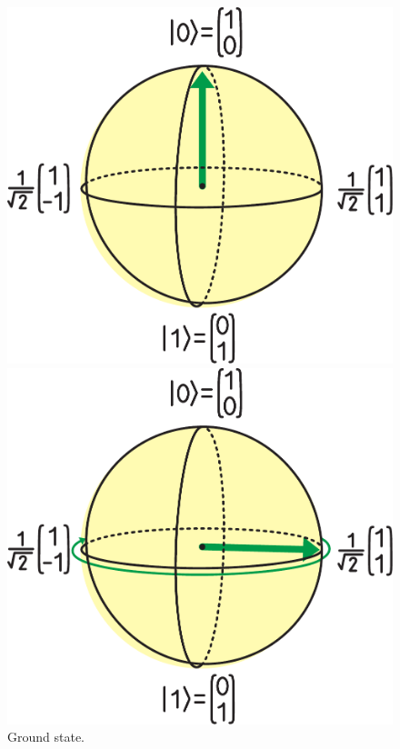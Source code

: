 \begin{figure}[H]
    \centering

    \begin{minipage}[t]{0.3\linewidth}
        \centering
        \includegraphics[width=\linewidth]{pdf/states/ground-state.pdf}
        \caption{Ground state.}
        \label{fig:Bloch-sphere-ground-state}
    \end{minipage}
    \hfill
    \begin{minipage}[t]{0.3\linewidth}
        \centering
        \includegraphics[width=\linewidth]{pdf/states/superposition-state.pdf}

\end{minipage}
\end{figure}

